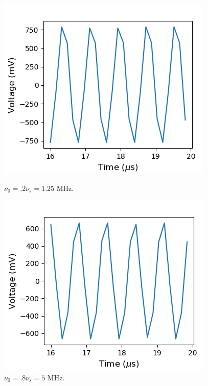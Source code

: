 \documentclass[a4paper]{article}
\begin{document}
\begin{figure}
\centering
\begin{minipage}{.5\textwidth}
	\centering
	\includegraphics[width=.8\linewidth]{5-2_trial2}
	\caption{$\nu_0 = .2 \nu_s = 1.25$ MHz.}
	\label{fig:Nyq2}
\end{minipage}%
\begin{minipage}{.5\textwidth}
	\centering
	\includegraphics[width=.8\linewidth]{5-2_trial8}
	\caption{$\nu_0 = .8 \nu_s = 5$ MHz.}
	\label{fig:Nyq8}
\end{minipage}
\end{figure}
\end{document}
